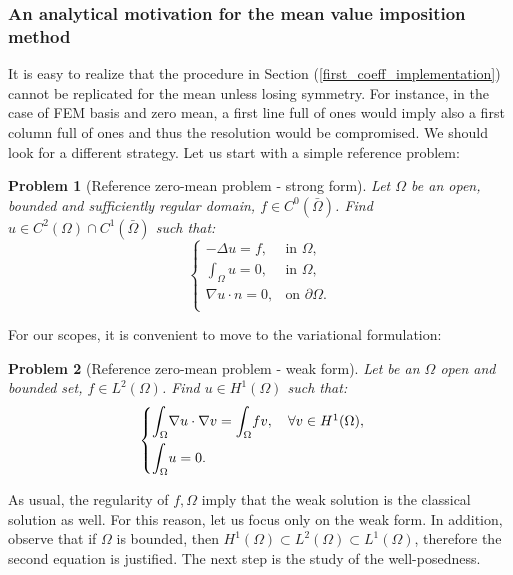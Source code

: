 \documentclass[a4paper,11pt]{article}
\newtheorem{problem}{Problem}
\begin{document}
\subsubsection{An analytical motivation for the mean value imposition method}
\noindent It is easy to realize that the procedure in Section (\ref{first_coeff_implementation}) cannot be replicated for the mean unless losing symmetry. For instance, in the case of FEM basis and zero mean, a first line full of ones would imply also a first column full of ones and thus the resolution would be compromised. We should look for a different strategy. Let us start with a simple reference problem: \\
\begin{problem}[Reference zero-mean problem - strong form] Let $\Omega$ be an open, bounded and sufficiently regular domain, $f\in C^0(\bar{\Omega})$. Find $u\in C^2(\Omega)\cap C^1(\bar{\Omega})$ such that:
\begin{equation*}
\begin{cases}
-\Delta{u}=f, & \text{in } \Omega,\\
\int_{\Omega} u = 0, & \text{in } \Omega, \\
\nabla u \cdot n = 0, & \text{on } \partial \Omega. \\
\end{cases}
\end{equation*}
\end{problem}\vspace{3mm}
\noindent For our scopes, it is convenient to move to the variational formulation:
\begin{problem}[Reference zero-mean problem - weak form]  \label{reference_problem} Let be an $\Omega$ open and bounded set, $f\in L^2(\Omega)$. Find $u\in H^1(\Omega)$ such that:
	\begin{equation*}
	\begin{cases}
	\mathlarger{\int}_{\Omega}\nabla u \cdot \nabla v = \mathlarger{\int}_{\Omega} fv, \quad \forall v \in H^1(\Omega),\\[2ex]
	\mathlarger{\int}_{\Omega}u = 0.
	\end{cases}
	\end{equation*}
\end{problem}
\noindent As usual, the regularity of $f,\Omega$ imply that the weak solution is the classical solution as well. For this reason, let us focus only on the weak form. In addition, observe that if $\Omega$ is bounded, then $H^1(\Omega) \subset L^2(\Omega) \subset L^1(\Omega)$, therefore the second equation is justified. The next step is the study of the well-posedness.
\end{document}
